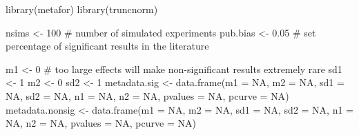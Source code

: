 \documentclass[
  letterpaper,
  DIV=11,
  numbers=noendperiod]{scrreprt}
\newenvironment{Shaded}{\begin{snugshade}}{\end{snugshade}}
\newcommand{\AttributeTok}[1]{\textcolor[rgb]{0.40,0.45,0.13}{#1}}
\newcommand{\CommentTok}[1]{\textcolor[rgb]{0.37,0.37,0.37}{#1}}
\newcommand{\ConstantTok}[1]{\textcolor[rgb]{0.56,0.35,0.01}{#1}}
\newcommand{\DecValTok}[1]{\textcolor[rgb]{0.68,0.00,0.00}{#1}}
\newcommand{\FloatTok}[1]{\textcolor[rgb]{0.68,0.00,0.00}{#1}}
\newcommand{\FunctionTok}[1]{\textcolor[rgb]{0.28,0.35,0.67}{#1}}
\newcommand{\NormalTok}[1]{\textcolor[rgb]{0.00,0.23,0.31}{#1}}
\newcommand{\OtherTok}[1]{\textcolor[rgb]{0.00,0.23,0.31}{#1}}
\begin{document}
\begin{Shaded}
\begin{Highlighting}[]
\FunctionTok{library}\NormalTok{(metafor)}
\FunctionTok{library}\NormalTok{(truncnorm)}

\NormalTok{nsims }\OtherTok{\textless{}{-}} \DecValTok{100} \CommentTok{\# number of simulated experiments}
\NormalTok{pub.bias }\OtherTok{\textless{}{-}} \FloatTok{0.05} \CommentTok{\# set percentage of significant results in the literature}

\NormalTok{m1 }\OtherTok{\textless{}{-}} \DecValTok{0} \CommentTok{\# too large effects will make non{-}significant results extremely rare}
\NormalTok{sd1 }\OtherTok{\textless{}{-}} \DecValTok{1}
\NormalTok{m2 }\OtherTok{\textless{}{-}} \DecValTok{0}
\NormalTok{sd2 }\OtherTok{\textless{}{-}} \DecValTok{1}
\NormalTok{metadata.sig }\OtherTok{\textless{}{-}} \FunctionTok{data.frame}\NormalTok{(}\AttributeTok{m1 =} \ConstantTok{NA}\NormalTok{, }\AttributeTok{m2 =} \ConstantTok{NA}\NormalTok{, }\AttributeTok{sd1 =} \ConstantTok{NA}\NormalTok{, }\AttributeTok{sd2 =} \ConstantTok{NA}\NormalTok{, }
                           \AttributeTok{n1 =} \ConstantTok{NA}\NormalTok{, }\AttributeTok{n2 =} \ConstantTok{NA}\NormalTok{, }\AttributeTok{pvalues =} \ConstantTok{NA}\NormalTok{, }\AttributeTok{pcurve =} \ConstantTok{NA}\NormalTok{)}
\NormalTok{metadata.nonsig }\OtherTok{\textless{}{-}} \FunctionTok{data.frame}\NormalTok{(}\AttributeTok{m1 =} \ConstantTok{NA}\NormalTok{, }\AttributeTok{m2 =} \ConstantTok{NA}\NormalTok{, }\AttributeTok{sd1 =} \ConstantTok{NA}\NormalTok{, }\AttributeTok{sd2 =} \ConstantTok{NA}\NormalTok{, }
                              \AttributeTok{n1 =} \ConstantTok{NA}\NormalTok{, }\AttributeTok{n2 =} \ConstantTok{NA}\NormalTok{, }\AttributeTok{pvalues =} \ConstantTok{NA}\NormalTok{, }\AttributeTok{pcurve =} \ConstantTok{NA}\NormalTok{)}


\end{Highlighting}
\end{Shaded}
\end{document}
